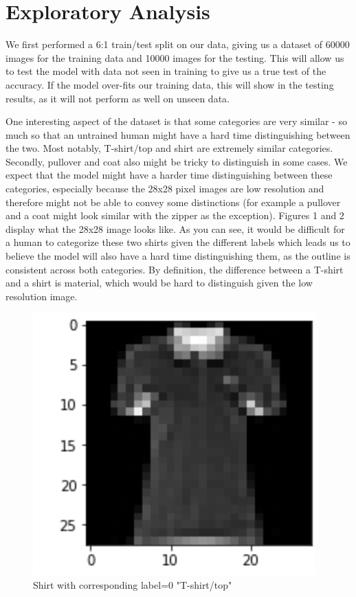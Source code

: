 
\section{Exploratory Analysis}
\label{sec:background}

We first performed a 6:1 train/test split on our data, giving us a dataset of 60000 images for the training data and 10000 images for the testing. This will allow us to test the model with data not seen in training to give us a true test of the accuracy. If the model over-fits our training data, this will show in the testing results, as it will not perform as well on unseen data.

One interesting aspect of the dataset is that some categories are very similar - so much so that an untrained human might have a hard time distinguishing between the two. Most notably, T-shirt/top and shirt are extremely similar categories. Secondly, pullover and coat also might be tricky to distinguish in some cases. We expect that the model might have a harder time distinguishing between these categories, especially because the 28x28 pixel images are low resolution and therefore might not be able to convey some distinctions (for example a pullover and a coat might look similar with the zipper as the exception). Figures 1 and 2 display what the 28x28 image looks like. As you can see, it would be difficult for a human to categorize these two shirts given the different labels which leads us to believe the model will also have a hard time distinguishing them, as the outline is consistent across both categories. By definition, the difference between a T-shirt and a shirt is material, which would be hard to distinguish given the low resolution image.


\begin{figure}[!h]
    \centering
    \includegraphics{label0.png}
    \caption{Shirt with corresponding label=0 "T-shirt/top"}
    \label{fig:label0}
\end{figure}

